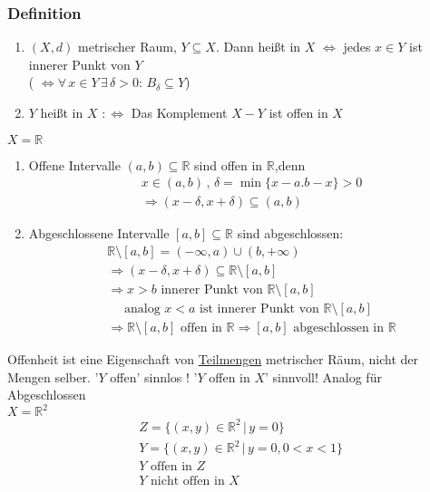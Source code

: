\subsubsection[Offen, Abgeschlossen]{Definition} %
\label{ssub:definition}
\begin{enumerate}
	\item $(X,d)$ metrischer Raum, $Y \subseteq X$. Dann heißt  in $X$ $\Leftrightarrow $ jedes $x \in Y$ ist innerer Punkt von $Y$ \\
	( $\Leftrightarrow \forall\, x \in Y \, \exists \, \delta >0: \, B_{\delta } \subseteq Y$)
	\item $Y$ heißt  in $X$ $:\Leftrightarrow $ Das Komplement $X-Y$ ist offen in $X$
\end{enumerate}
 $X = \mathbb{R}$
 \begin{enumerate}
 	\item Offene Intervalle $(a,b) \subseteq \mathbb{R}$ sind offen in $\mathbb{R}$,denn
  \begin{align*}
  	&x \in (a,b) \,,\, \delta = \min \{ x-a.b-x \} >0 \\
	&\Rightarrow (x-\delta ,x+\delta ) \subseteq (a,b)
  \end{align*}  
  
 \item Abgeschlossene Intervalle $[a,b] \subseteq \mathbb{R}$ sind abgeschlossen: 
 \begin{align*}
 	&\mathbb{R} \setminus [a,b] = (-\infty,a) \cup (b, +\infty) \\
 	&\Rightarrow (x-\delta ,x+\delta ) \subseteq \mathbb{R} \setminus [a,b] \\
	&\Rightarrow x>b \text{ innerer Punkt von } \mathbb{R} \setminus[a,b] \\
	&\quad \text{ analog } x<a \text{ ist innerer Punkt von } \mathbb{R}\setminus[a,b] \\
	&\Rightarrow \mathbb{R}\setminus[a,b] \text{ offen in } \mathbb{R} \Rightarrow  [a,b] \text{ abgeschlossen in } \mathbb{R} 
\end{align*}
\end{enumerate}

Offenheit ist eine Eigenschaft von \underline{Teilmengen} metrischer Räum, nicht der Mengen selber. '$Y$ offen' sinnlos ! '$Y$ offen in $X$' sinnvoll! Analog für Abgeschlossen 
 \\
$X = \mathbb{R}^2$ \\
\begin{align*}
	&Z = \{ (x,y) \in \mathbb{R}^2\, |\, y=0 \} \\
	&Y = \{ (x,y) \in \mathbb{R}^2 \, | \, y=0,0<x<1 \} \\
	&Y \text{ offen in } Z \\
	&Y \text{ nicht offen in } X \\
	\end{align*}
